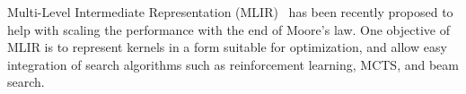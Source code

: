 Multi-Level Intermediate Representation (MLIR)~\cite{lattner2020mlir} has been recently proposed to help with scaling the performance with the end of Moore's law. One objective of MLIR is to represent kernels in a form suitable for optimization, and allow easy integration of search algorithms such as reinforcement learning, MCTS, and beam search.



